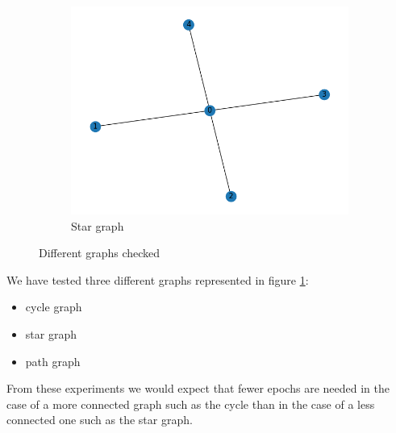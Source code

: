 \documentclass[a4paper,11pt,oneside]{book}
\begin{document}
\begin{figure}[H]
\begin{subfigure}{0.32\textwidth}
    \includegraphics[width=\textwidth]{star/graph}
    \caption{Star graph}
    \end{subfigure}
\caption{Different graphs checked}
\label{Graphs}
\end{figure}

\bigskip
We have tested three different graphs represented in figure \ref{Graphs}:
\begin{itemize}
\item cycle graph
\item star graph
\item path graph
\end{itemize}

From these experiments we would expect that fewer epochs are needed in the case of a more connected graph such as the cycle than in the case of a less connected one such as the star graph.
\end{document}

